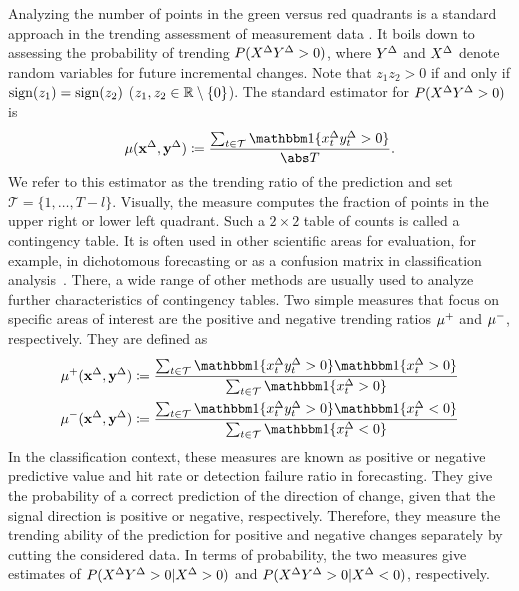 Analyzing the number of points in the green versus red quadrants is a standard approach in the trending assessment of measurement data \parencite{Critchley2010,Saugel2015}. 
It boils down to assessing the probability of trending $P(X^{\Delta} Y^{\Delta} > 0)$, where $Y^{\Delta}$ and $X^{\Delta}$ denote random variables for future incremental changes.
Note that $z_1 z_2 > 0$ if and only if $\operatorname{sign}(z_1) = \operatorname{sign}(z_2)$ ($z_1, z_2 \in \mathbb{R} \setminus \{ 0 \}$).
The standard estimator for $P(X^{\Delta} Y^{\Delta} > 0)$ is
\begin{equation}
    \acc (\diffx, \diffy) \coloneqq \frac{\sum_{t \in \mathcal{T}} \ind{\diffxt \diffyt > 0}}{\card{T}}.\label{eq:acc}
\end{equation}
We refer to this estimator as the trending ratio of the prediction and set $\mathcal{T} = \{1, \dots, T-l\}$.
Visually, the measure computes the fraction of points in the upper right or lower left quadrant.
Such a $2 \times 2$ table of counts is called a contingency table.
It is often used in other scientific areas for evaluation, for example, in dichotomous forecasting or as a confusion matrix in classification analysis~\parencites(see, e.g., the introductions in)()[Ch. 4]{James2021}[Ch. 3]{Jolliffe2012}.
There, a wide range of other methods are usually used to analyze further characteristics of contingency tables.
Two simple measures that focus on specific areas of interest are the positive and negative trending ratios $\mu^+$ and $\mu^-$, respectively.
They are defined as
\begin{align}
    \accp (\diffx, \diffy) &\coloneqq \frac{\sum_{t \in \mathcal{T}} \ind{\diffxt \diffyt > 0} \ind{\diffxt > 0}}{\sum_{t \in \mathcal{T}} \ind{\diffxt > 0}} \label{eq:accp}\\
    \accm (\diffx, \diffy) &\coloneqq \frac{\sum_{t \in \mathcal{T}} \ind{\diffxt \diffyt > 0} \ind{\diffxt < 0}}{\sum_{t \in \mathcal{T}} \ind{\diffxt < 0}}\label{eq:accm}
\end{align}
In the classification context, these measures are known as positive or negative predictive value and hit rate or detection failure ratio in forecasting.
They give the probability of a correct prediction of the direction of change, given that the signal direction is positive or negative, respectively.
Therefore, they measure the trending ability of the prediction for positive and negative changes separately by cutting the considered data.
In terms of probability, the two measures give estimates of $P(X^{\Delta} Y^{\Delta} > 0 | X^{\Delta} > 0)$ and $P(X^{\Delta} Y^{\Delta} > 0 | X^{\Delta} < 0)$, respectively.

